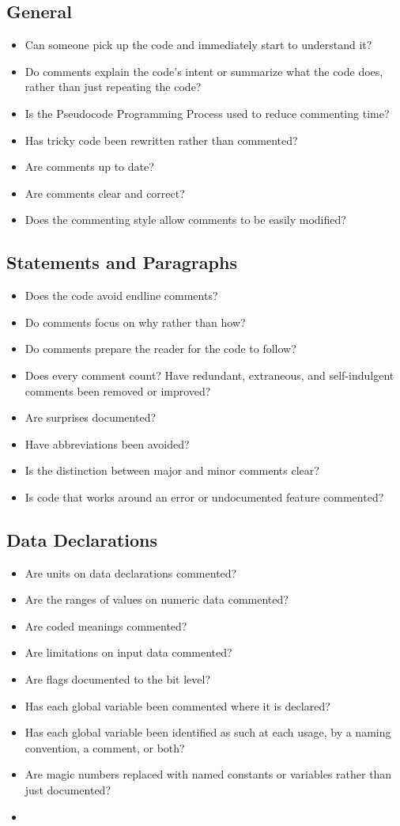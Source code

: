 \subsection{General}
\begin{itemize}
\item Can someone pick up the code and immediately start to understand it?
\item Do comments explain the code’s intent or summarize what the code does, rather than just repeating the code?
\item Is the Pseudocode Programming Process used to reduce commenting time?
\item Has tricky code been rewritten rather than commented?
\item Are comments up to date?
\item Are comments clear and correct?
\item Does the commenting style allow comments to be easily modified?
\end{itemize}
\subsection{Statements and Paragraphs}
\begin{itemize}
\item Does the code avoid endline comments?
\item Do comments focus on why rather than how?
\item Do comments prepare the reader for the code to follow?
\item Does every comment count? Have redundant, extraneous, and self-indulgent comments been removed or improved?
\item Are surprises documented?
\item Have abbreviations been avoided?
\item Is the distinction between major and minor comments clear?
\item Is code that works around an error or undocumented feature commented?
\end{itemize}

\subsection{Data Declarations}
\begin{itemize}
\item Are units on data declarations commented?
\item Are the ranges of values on numeric data commented?
\item Are coded meanings commented?
\item Are limitations on input data commented?
\item Are flags documented to the bit level?
\item Has each global variable been commented where it is declared?
\item Has each global variable been identified as such at each usage, by a naming convention, a comment, or both?
\item Are magic numbers replaced with named constants or variables rather than just documented?
\item 
\end{itemize}
